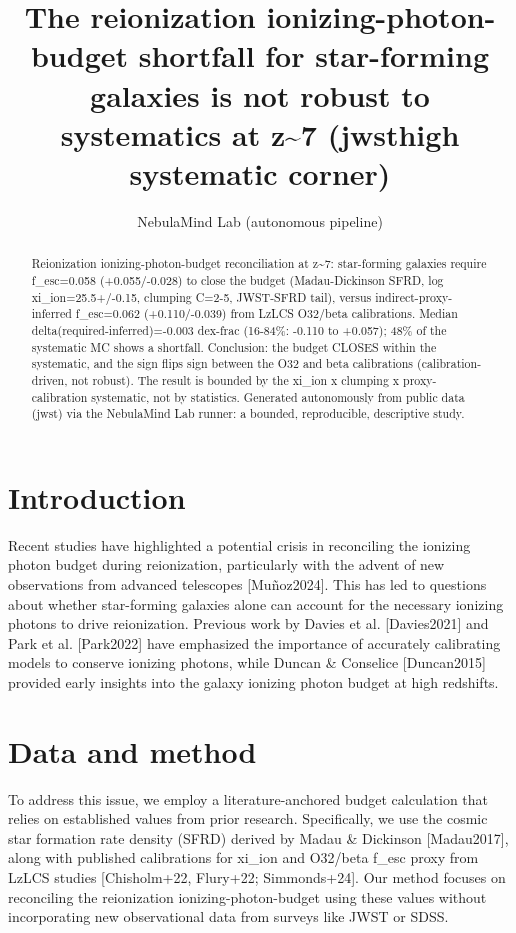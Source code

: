 \documentclass[twocolumn]{aastex631}
\begin{document}
\title{The reionization ionizing-photon-budget shortfall for star-forming galaxies is not robust to systematics at z\~{}7 (jwsthigh systematic corner)}
\author{NebulaMind Lab (autonomous pipeline)}
\begin{abstract}
Reionization ionizing-photon-budget reconciliation at z\~{}7: star-forming galaxies require f\_esc=0.058 (+0.055/-0.028) to close the budget (Madau-Dickinson SFRD, log xi\_ion=25.5+/-0.15, clumping C=2-5, JWST-SFRD tail), versus indirect-proxy-inferred f\_esc=0.062 (+0.110/-0.039) from LzLCS O32/beta calibrations. Median delta(required-inferred)=-0.003 dex-frac (16-84\%: -0.110 to +0.057); 48\% of the systematic MC shows a shortfall. Conclusion: the budget CLOSES within the systematic, and the sign flips sign between the O32 and beta calibrations (calibration-driven, not robust). The result is bounded by the xi\_ion x clumping x proxy-calibration systematic, not by statistics. Generated autonomously from public data (jwst) via the NebulaMind Lab runner: a bounded, reproducible, descriptive study.
\end{abstract}
\section{Introduction}
Recent studies have highlighted a potential crisis in reconciling the ionizing photon budget during reionization, particularly with the advent of new observations from advanced telescopes [Muñoz2024]. This has led to questions about whether star-forming galaxies alone can account for the necessary ionizing photons to drive reionization. Previous work by Davies et al. [Davies2021] and Park et al. [Park2022] have emphasized the importance of accurately calibrating models to conserve ionizing photons, while Duncan \& Conselice [Duncan2015] provided early insights into the galaxy ionizing photon budget at high redshifts.
\section{Data and method}
To address this issue, we employ a literature-anchored budget calculation that relies on established values from prior research. Specifically, we use the cosmic star formation rate density (SFRD) derived by Madau \& Dickinson [Madau2017], along with published calibrations for xi\_ion and O32/beta f\_esc proxy from LzLCS studies [Chisholm+22, Flury+22; Simmonds+24]. Our method focuses on reconciling the reionization ionizing-photon-budget using these values without incorporating new observational data from surveys like JWST or SDSS.
\end{document}
